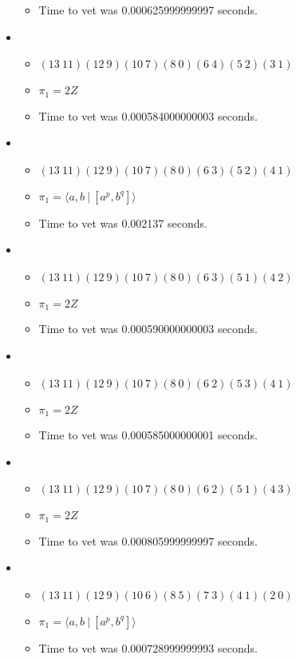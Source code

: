 \documentclass{article}
\begin{document}
\begin{itemize}
\begin{itemize}
      \item Time to vet was 0.000625999999997 seconds.
\end{itemize}
\item \begin{itemize}
      \item $(13\ 11)(12\ 9)(10\ 7)(8\ 0)(6\ 4)(5\ 2)(3\ 1)$
      \item $\pi_1 =2 Z$
      \item Time to vet was 0.000584000000003 seconds.
\end{itemize}
\item \begin{itemize}
      \item $(13\ 11)(12\ 9)(10\ 7)(8\ 0)(6\ 3)(5\ 2)(4\ 1)$
      \item $\pi_1 = \langle a,b\ |\ [a^p,b^q]\rangle$
      \item Time to vet was 0.002137 seconds.
\end{itemize}
\item \begin{itemize}
      \item $(13\ 11)(12\ 9)(10\ 7)(8\ 0)(6\ 3)(5\ 1)(4\ 2)$
      \item $\pi_1 =2 Z$
      \item Time to vet was 0.000590000000003 seconds.
\end{itemize}
\item \begin{itemize}
      \item $(13\ 11)(12\ 9)(10\ 7)(8\ 0)(6\ 2)(5\ 3)(4\ 1)$
      \item $\pi_1 =2 Z$
      \item Time to vet was 0.000585000000001 seconds.
\end{itemize}
\item \begin{itemize}
      \item $(13\ 11)(12\ 9)(10\ 7)(8\ 0)(6\ 2)(5\ 1)(4\ 3)$
      \item $\pi_1 =2 Z$
      \item Time to vet was 0.000805999999997 seconds.
\end{itemize}
\item \begin{itemize}
      \item $(13\ 11)(12\ 9)(10\ 6)(8\ 5)(7\ 3)(4\ 1)(2\ 0)$
      \item $\pi_1 = \langle a,b\ |\ [a^p,b^q]\rangle$
      \item Time to vet was 0.000728999999993 seconds.

\end{itemize}
\end{itemize}
\end{document}
